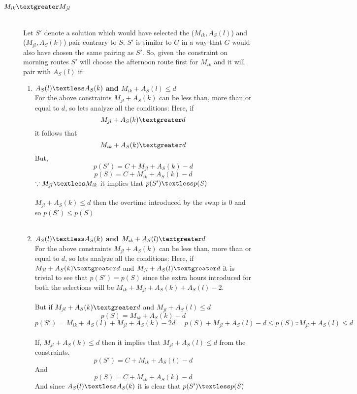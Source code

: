\documentclass[8pt]{article}
\begin{document}
\begin{description}
    \item[$M_{ik} \textgreater M_{jl}$] \hfill \\
        Let $S'$ denote a solution which would have selected the ($M_{ik}, A_S(l)$) and ($M_{jl}, A_S(k)$) pair contrary to $S$. $S'$ is similar to $G$ in a way that $G$ would also have chosen the same pairing as $S'$. So, given the constraint on morning routes $S'$ will choose the afternoon route first for $M_{ik}$ and it will pair with $A_S(l)$ if:

    \begin{enumerate}
        \item \textbf{$A_S(l) \textless A_S(k)$ and $M_{ik} + A_S(l) \leq d$} \hfill \\
            For the above constraints $M_{jl} + A_S(k)$ can be less than, more than or equal to $d$, so lets analyze all the conditions:
            Here, if $$M_{jl} + A_S(k) \textgreater d$$ it follows that $$M_{ik} + A_S(k) \textgreater d$$ But, $$p(S') = C + M_{jl} + A_S(k) - d$$
            $$p(S) = C + M_{ik} + A_S(k) - d$$ $\because M_{jl} \textless M_{ik}$ it implies that $p(S') \textless p(S)$ \\ \\
            $M_{jl} + A_S(k) \leq d$ then the overtime introduced by the swap is $0$ and so $p(S') \leq p(S) $ \\ \\


        \item \textbf{$A_S(l) \textless A_S(k)$ and $M_{ik} + A_S(l) \textgreater d$} \hfill \\
            For the above constraints $M_{jl} + A_S(k)$ can be less than, more than or equal to $d$, so lets analyze all the conditions:
            Here, if $M_{jl} + A_S(k) \textgreater d$ and $M_{jl} + A_S(l) \textgreater d$ it is trivial to see that $p(S') = p(S)$ since the extra hours introduced for both the selections will be $M_{ik} + M_{jl} + A_S(k) + A_S(l) - 2$. \\ \\
            But if $M_{jl} + A_S(k) \textgreater d$ and $M_{jl} + A_S(l) \leq d$
            $$p(S) = M_{ik} + A_S(k) - d$$
            $$p(S') = M_{ik} + A_S(l) + M_{jl} + A_S(k) - 2d = p(S) + M_{jl} + A_S(l) - d \leq p(S) \because M_{jl} + A_S(l) \leq d$$\\

            If, $M_{jl} + A_S(k) \leq d$ then it implies that $M_{jl} + A_S(l) \leq d$ from the constraints. $$p(S') =  C + M_{ik} + A_S(l) - d$$ And $$p(S) = C + M_{ik} + A_S(k) - d$$
            And since $A_S(l) \textless A_S(k)$ it is clear that $p(S') \textless p(S)$
    \end{enumerate}
\end{description}
\end{document}

